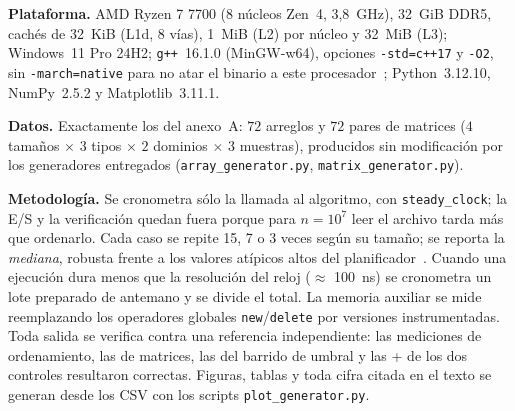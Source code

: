%



\textbf{Plataforma.} AMD Ryzen 7 7700 (8 núcleos Zen~4, 3{,}8~GHz), 32~GiB
DDR5, cachés de 32~KiB (L1d, 8 vías), 1~MiB (L2) por núcleo y 32~MiB (L3);
Windows~11 Pro 24H2; \texttt{g++}~16.1.0 (MinGW-w64), opciones
\texttt{-std=c++17} y \texttt{-O2}, sin \texttt{-march=native} para no atar el
binario a este procesador~\cite{hales2017replicability}; Python~3.12.10,
NumPy~2.5.2 y Matplotlib~3.11.1.

\textbf{Datos.} Exactamente los del anexo~A: $72$ arreglos y $72$ pares de
matrices ($4$ tamaños $\times$ $3$ tipos $\times$ $2$ dominios $\times$ $3$
muestras), producidos sin modificación por los generadores entregados
(\texttt{array\_generator.py}, \texttt{matrix\_generator.py}).

\textbf{Metodología.} Se cronometra sólo la llamada al algoritmo, con
\texttt{steady\_clock}; la E/S y la verificación quedan fuera porque para
$n=10^{7}$ leer el archivo tarda más que ordenarlo. Cada caso se repite 15, 7 o
3 veces según su tamaño; se reporta la \emph{mediana}, robusta frente a los
valores atípicos altos del planificador~\cite{mcgeoch2012}. Cuando una
ejecución dura menos que la resolución del reloj ($\approx$ 100~ns) se
cronometra un lote preparado de antemano y se divide el total. La memoria
auxiliar se mide reemplazando los operadores globales
\texttt{new}/\texttt{delete} por versiones instrumentadas. Toda salida se
verifica contra una referencia independiente: las \SortNumRows{} mediciones
de ordenamiento, las \MatNumRows{} de matrices, las \MatSweepRows{} del
barrido de umbral y las \MatTypeCheckRows{}+\MatStrideRows{} de los dos
controles resultaron correctas. Figuras, tablas y toda cifra citada en el
texto se generan desde los CSV con los scripts \texttt{plot\_generator.py}.

